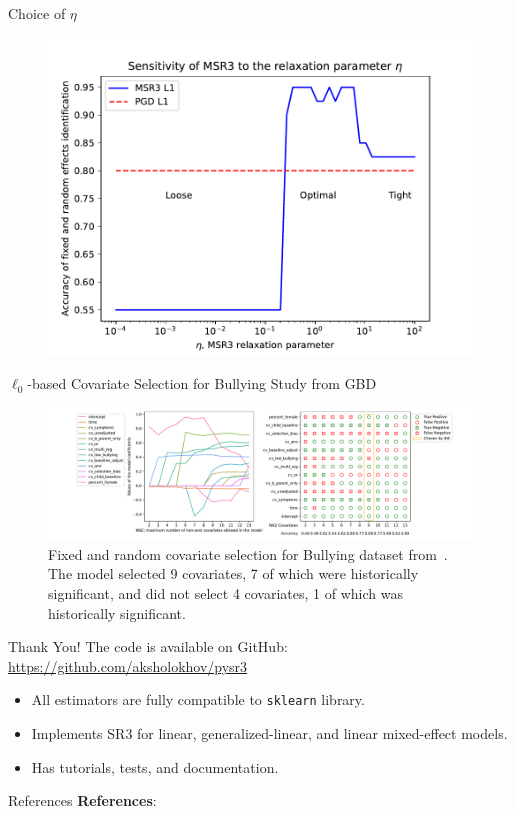 \documentclass[8pt]{beamer}
\begin{document}
\begin{frame}{Choice of $\eta$}
	\begin{figure}
		\includegraphics[width=\textwidth]{Figures/eta_L1.pdf}
	\end{figure}
\end{frame}

\begin{frame}{$\ell_0$-based Covariate Selection for Bullying Study from GBD}
	\begin{figure}
		\includegraphics[width=\textwidth]{Figures/bullying_data_assessment_selection.pdf}
		\caption{Fixed and random covariate selection for Bullying dataset from~\cite{GBD}. The model selected 9 covariates, 7 of which were historically significant, and did not select 4 covariates, 1 of which was historically significant.}
	\end{figure}
\end{frame}

\begin{frame}{Thank You!}
	The code is available on GitHub: \href{github.com/aksholokhov/pysr3}{https://github.com/aksholokhov/pysr3}
	\begin{itemize}
		\item All estimators are fully compatible to \texttt{sklearn} library.
		\item Implements SR3 for linear, generalized-linear, and linear mixed-effect models.
		\item Has tutorials, tests, and documentation.
	\end{itemize}
\end{frame}
\begin{frame}{References}
	\textbf{References}: 
	
	
\end{frame}
\end{document}
